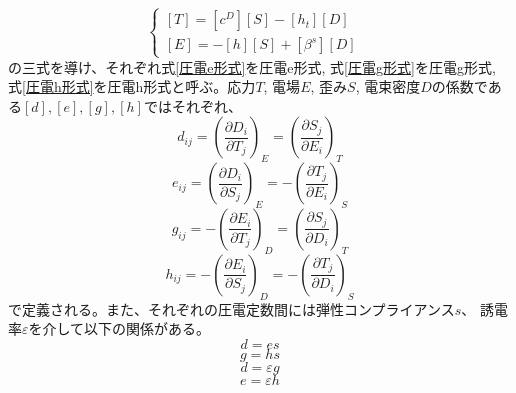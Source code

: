 \documentclass[dvipdfmx,12pt,a4paper]{jreport}
\begin{document}
			\begin{equation}
				\begin{cases}
					\left[T\right]=\left[c^D\right]\left[S\right]-\left[h_t\right]\left[D\right] & \\
					\left[E\right]=-\left[h\right]\left[S\right]+\left[\beta^s\right]\left[D\right]
				\end{cases}
				\label{圧電h形式}
			\end{equation}
			の三式を導け、それぞれ式\ref{圧電e形式}を圧電e形式, 
			式\ref{圧電g形式}を圧電g形式, 式\ref{圧電h形式}を圧電h形式と呼ぶ。応力$T$, 電場$E$, 歪み$S$, 電束密度$D$の係数である$[d],[e],[g],[h]$ではそれぞれ、
			\begin{equation}
				d_{ij}=\left(\frac{\partial D_i}{\partial T_j}\right)_E=\left(\frac{\partial S_j}{\partial E_i}\right)_T
			\end{equation}
			\begin{equation}
				e_{ij}=\left(\frac{\partial D_i}{\partial S_j}\right)_E=-\left(\frac{\partial T_j}{\partial E_i}\right)_S
			\end{equation} 
			\begin{equation}
				g_{ij}=-\left(\frac{\partial E_i}{\partial T_j}\right)_D=\left(\frac{\partial S_j}{\partial D_i}\right)_T
			\end{equation}
			\begin{equation}
				h_{ij}=-\left(\frac{\partial E_i}{\partial S_j}\right)_D=-\left(\frac{\partial T_j}{\partial D_i}\right)_S
			\end{equation}
			で定義される。また、それぞれの圧電定数間には弾性コンプライアンス$s$、
			誘電率$\varepsilon$を介して以下の関係がある。
			\begin{equation}
				d = e s
			\end{equation}
			\begin{equation}
				g = h s
			\end{equation}
			\begin{equation}
				d = \varepsilon g
			\end{equation}
			\begin{equation}
				e = \varepsilon h
			\end{equation}
\end{document}
